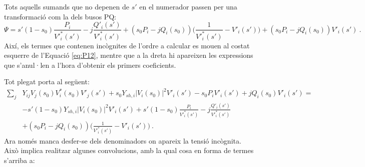 Tots aquells sumands que no depenen de $s'$ en el numerador passen per una transformació com la dels busos PQ:
\begin{equation}
    \Psi = s'(1-s_0)\frac{P_i}{V'^{*}_i(s')}-j\frac{Q'_i(s')}{V'^{*}_i(s')}+(s_0P_i-jQ_i(s_0))\biggl(\frac{1}{V'^{*}_i(s')}-V'_i(s')\biggr)+(s_0P_i-jQ_i(s_0))V'_i(s')\ .
    \label{eq:P13}
\end{equation} 
Així, els termes que contenen incògnites de l'ordre a calcular es mouen al costat esquerre de l'Equació \ref{eq:P12}, mentre que a la dreta hi apareixen les expressions que s'anul·len a l'hora d'obtenir els primers coeficients.

Tot plegat porta al següent:
\begin{equation}
    \begin{split}
    \sum_j &Y_{ij}V_j(s_0)V^*_i(s_0)V'_j(s')+s_0Y_{sh,i}|V_i(s_0)|^2V'_i(s')-s_0P_iV'_i(s')+jQ_i(s_0)V'_i(s')=\\
    &-s'(1-s_0)Y_{sh,i}|V_i(s_0)|^2V'_i(s')+s'(1-s_0)\frac{P_i}{V'^{*}_i(s')}-j\frac{Q'_i(s')}{V'^{*}_i(s')}\\
    &+(s_0P_i-jQ_i(s_0))\biggl(\frac{1}{V'^{*}_i(s')}-V'_i(s')\biggr)\ .   
\end{split}
        \label{eq:P14}
\end{equation}
Ara només manca desfer-se dels denominadors on apareix la tensió incògnita. Això implica realitzar algunes convolucions, amb la qual cosa en forma de termes s'arriba a:

